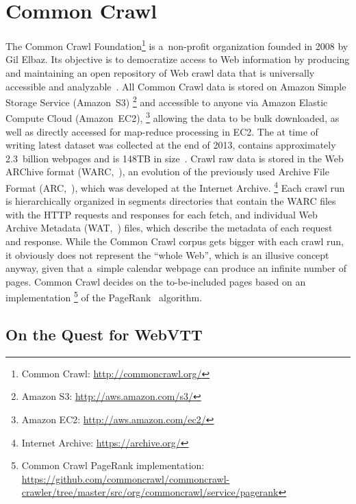 \documentclass{sig-alternate}
\newcommand{\inlinelistingsize}{\fontsize{8pt}{11pt}}
\let\oldurl\url
\renewcommand{\url}[1]{\inlinelistingsize\oldurl{#1}}
\begin{document}
\section{Common Crawl}

The Common Crawl Foundation\footnote{Common Crawl: \url{http://commoncrawl.org/}}
is a~non-profit organization founded in 2008 by Gil Elbaz.
Its objective is to democratize access to Web information
by producing and maintaining an open repository of Web crawl data
that is universally accessible and analyzable~\cite{simonite2013commoncrawl}.
All Common Crawl data is stored on Amazon Simple Storage Service (Amazon~S3)%
\footnote{Amazon S3: \url{http://aws.amazon.com/s3/}} and
accessible to anyone via Amazon Elastic Compute Cloud (Amazon~EC2),%
\footnote{Amazon EC2: \url{http://aws.amazon.com/ec2/}}
allowing the data to be bulk downloaded,
as well as directly accessed for map-reduce processing in EC2.
The at time of writing latest dataset was collected at the end of 2013,
contains approximately 2.3~billion webpages and is 148TB in size~\cite{green2014winter}.
Crawl raw data is stored in the Web ARChive format
(WARC,~\cite{iso285002008warc}), an evolution of the previously used
Archive File Format (ARC,~\cite{burner1996arc}),
which was developed at the Internet Archive.%
\footnote{Internet Archive: \url{https://archive.org/}}
Each crawl run is hierarchically organized in segments directories
that contain the WARC files with the HTTP requests and responses for each fetch,
and individual Web Archive Metadata (WAT,~\cite{goel2011wat}) files,
which describe the metadata of each request and response.
While the Common Crawl corpus gets bigger with each crawl run,
it obviously does not represent the ``whole Web'',
which is an illusive concept anyway,
given that a~simple calendar webpage can produce an infinite number of pages.
Common Crawl decides on the to-be-included pages based on an implementation%
\footnote{Common Crawl PageRank implementation:
\url{https://github.com/commoncrawl/commoncrawl-crawler/tree/master/src/org/commoncrawl/service/pagerank}}
of the PageRank~\cite{page1999pagerank} algorithm.

\subsection{On the Quest for WebVTT}
\end{document}
